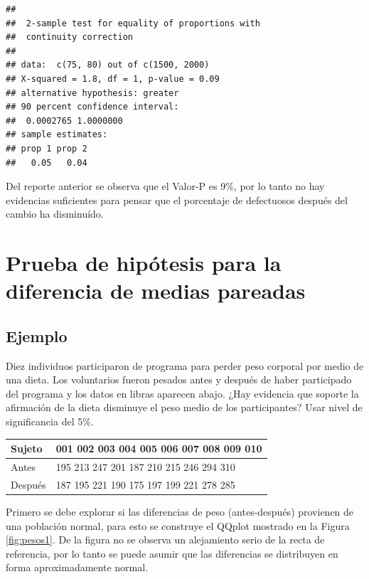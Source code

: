 \documentclass[10pt,]{krantz}
\begin{document}
\begin{verbatim}
## 
##  2-sample test for equality of proportions with
##  continuity correction
## 
## data:  c(75, 80) out of c(1500, 2000)
## X-squared = 1.8, df = 1, p-value = 0.09
## alternative hypothesis: greater
## 90 percent confidence interval:
##  0.0002765 1.0000000
## sample estimates:
## prop 1 prop 2 
##   0.05   0.04
\end{verbatim}

Del reporte anterior se observa que el Valor-P es 9\%, por lo tanto no
hay evidencias suficientes para pensar que el porcentaje de defectuosos
después del cambio ha disminuído.

\section{Prueba de hipótesis para la diferencia de medias
pareadas}\label{prueba-de-hipotesis-para-la-diferencia-de-medias-pareadas}

\subsection*{Ejemplo}\label{ejemplo-73}


Diez individuos participaron de programa para perder peso corporal por
medio de una dieta. Los voluntarios fueron pesados antes y después de
haber participado del programa y los datos en libras aparecen abajo.
¿Hay evidencia que soporte la afirmación de la dieta disminuye el peso
medio de los participantes? Usar nivel de significancia del 5\%.

\begin{longtable}[]{@{}ll@{}}
\toprule
Sujeto & 001 002 003 004 005 006 007 008 009 010\tabularnewline
\midrule
\endhead
Antes & 195 213 247 201 187 210 215 246 294 310\tabularnewline
Después & 187 195 221 190 175 197 199 221 278 285\tabularnewline
\bottomrule
\end{longtable}

Primero se debe explorar si las diferencias de peso (antes-después)
provienen de una población normal, para esto se construye el QQplot
mostrado en la Figura \ref{fig:pesos1}. De la figura no se observa un
alejamiento serio de la recta de referencia, por lo tanto se puede
asumir que las diferencias se distribuyen en forma aproximadamente
normal.
\end{document}
